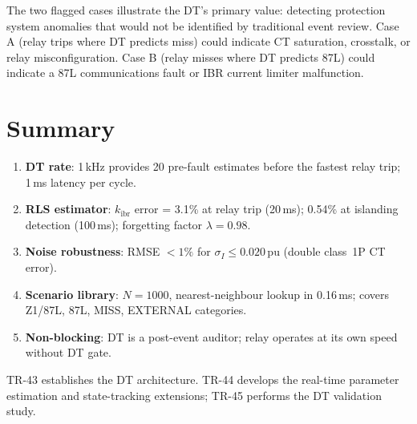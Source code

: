 \documentclass[11pt,a4paper]{article}
\begin{document}
\medskip\noindent
The two flagged cases illustrate the DT's primary value: detecting protection
system anomalies that would not be identified by traditional event review.
Case A (relay trips where DT predicts miss) could indicate CT saturation,
crosstalk, or relay misconfiguration.  Case B (relay misses where DT predicts
87L) could indicate a 87L communications fault or IBR current limiter malfunction.

\section{Summary}
\label{sec:summary}

\begin{enumerate}
  \item \textbf{DT rate}: 1\,kHz provides 20 pre-fault estimates before the
    fastest relay trip; 1\,ms latency per cycle.

  \item \textbf{RLS estimator}: $k_\mathrm{ibr}$ error = 3.1\% at relay trip
    (20\,ms); 0.54\% at islanding detection (100\,ms); forgetting factor
    $\lambda=0.98$.

  \item \textbf{Noise robustness}: RMSE $<1\%$ for $\sigma_I\leq0.020$\,pu
    (double class~1P CT error).

  \item \textbf{Scenario library}: $N=1000$, nearest-neighbour lookup in
    0.16\,ms; covers Z1/87L, 87L, MISS, EXTERNAL categories.

  \item \textbf{Non-blocking}: DT is a post-event auditor; relay operates at
    its own speed without DT gate.
\end{enumerate}

\noindent
TR-43 establishes the DT architecture.  TR-44 develops the real-time parameter
estimation and state-tracking extensions; TR-45 performs the DT validation study.



\end{document}
